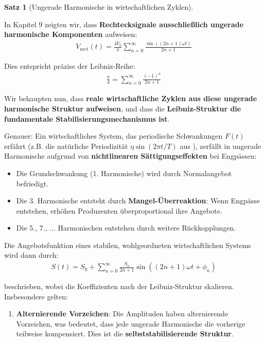 \documentclass[a4paper,12pt,twoside]{report}
\theoremstyle{definition}
\newtheorem{satz}{Satz}
\begin{document}
\begin{satz}[Ungerade Harmonische in wirtschaftlichen Zyklen]
\label{satz:leibniz_oekonomie}

In Kapitel 9 zeigten wir, dass \textbf{Rechtecksignale ausschließlich ungerade harmonische Komponenten} aufweisen:
\begin{align}
V_{\text{rect}}(t) = \frac{4V_0}{\pi} \sum_{n=0}^{\infty} \frac{\sin((2n+1)\omega t)}{2n+1}
\end{align}

Dies entspricht präzise der Leibniz-Reihe:
\begin{align}
\frac{\pi}{4} = \sum_{n=0}^{\infty} \frac{(-1)^n}{2n+1}
\end{align}

Wir behaupten nun, dass \textbf{reale wirtschaftliche Zyklen aus \cite{epp_signal} diese ungerade harmonische Struktur aufweisen}, und dass die \textbf{Leibniz-Struktur die fundamentale Stabilisierungsmechanismus ist}.

Genauer: Ein wirtschaftliches System, das periodische Schwankungen $F(t)$ erfährt (z.B. die natürliche Periodizität $\eta \sin(2\pi t/T)$ aus \cite{epp_signal}), zerfällt in ungerade Harmonische aufgrund von \textbf{nichtlinearen Sättigungseffekten} bei Engpässen:
\begin{itemize}
\item Die Grundschwankung (1. Harmonische) wird durch Normalangebot befriedigt.
\item Die 3. Harmonische entsteht durch \textbf{Mangel-Überreaktion}: Wenn Engpässe entstehen, erhöhen Produzenten überproportional ihre Angebote.
\item Die 5., 7., ... Harmonischen entstehen durch weitere Rückkopplungen.
\end{itemize}

Die Angebotsfunktion eines stabilen, wohlgeordneten wirtschaftlichen Systems wird dann durch:
\begin{align}
S(t) = S_0 + \sum_{n=0}^{\infty} \frac{S_n}{2n+1} \sin((2n+1)\omega t + \phi_n)
\end{align}

beschrieben, wobei die Koeffizienten nach der Leibniz-Struktur skalieren. Insbesondere gelten:

\begin{enumerate}

\item \textbf{Alternierende Vorzeichen}: Die Amplituden haben alternierende Vorzeichen, was bedeutet, dass jede ungerade Harmonische die vorherige teilweise kompensiert. Dies ist die \textbf{selbststabilisierende Struktur}.


\end{enumerate}
\end{satz}
\end{document}
